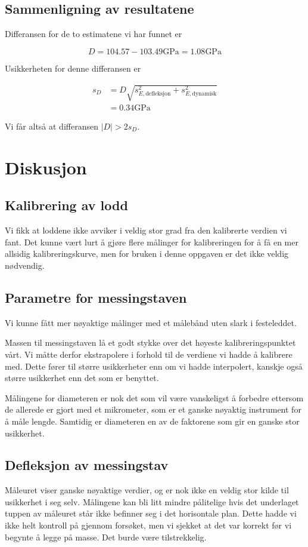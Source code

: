 \documentclass[a4paper,11pt, twocolumn]{article}
\begin{document}
\subsection{Sammenligning av resultatene}
Differansen for de to estimatene vi har funnet er 

\begin{equation}
	D = 104.57-103.49\text{GPa} = 1.08\text{GPa} 
\end{equation}

Usikkerheten for denne differansen er 

\begin{align}
s_D &= D\sqrt{s_{E, \text{defleksjon}}^2+s_{E, \text{dynamisk}}^2}\\
&= 0.34\text{GPa}
\end{align}

Vi får altså at differansen $|D|>2s_D$.
\section{Diskusjon}

\subsection{Kalibrering av lodd}
Vi fikk at loddene ikke avviker i veldig stor grad fra den kalibrerte verdien vi fant. Det kunne vært lurt å gjøre flere målinger for kalibreringen for å få en mer allsidig kalibreringskurve, men for bruken i denne oppgaven er det ikke veldig nødvendig.

\subsection{Parametre for messingstaven}
Vi kunne fått mer nøyaktige målinger med et målebånd uten slark i festeleddet.

Massen til messingstaven lå et godt stykke over det høyeste kalibreringspunktet vårt. Vi måtte derfor ekstrapolere i forhold til de verdiene vi hadde å kalibrere med. Dette fører til større usikkerheter enn om vi hadde interpolert, kanskje også større usikkerhet enn det som er benyttet.

Målingene for diameteren er nok det som vil være vanskeligst å forbedre ettersom de allerede er gjort med et mikrometer, som er et ganske nøyaktig instrument for å måle lengde. Samtidig er diameteren en av de faktorene som gir en ganske stor usikkerhet.

\subsection{Defleksjon av messingstav}
Måleuret viser ganske nøyaktige verdier, og er nok ikke en veldig stor kilde til usikkerhet i seg selv. Målingene kan bli litt mindre pålitelige hvis det underlaget tuppen av måleuret står ikke befinner seg i det horisontale plan. Dette hadde vi ikke helt kontroll på gjennom forsøket, men vi sjekket at det var korrekt før vi begynte å legge på masse. Det burde være tilstrekkelig.
\end{document}
